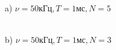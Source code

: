 \documentclass[a4paper,12pt]{article} %
\begin{document}
\begin{figure}[h!]
\begin{minipage}[h!]{0.47\linewidth}
 a) $\nu = 50 кГц, T = 1 мс, N = 5$\\
\end{minipage}
\hfill
\begin{minipage}[h!]{0.47\linewidth}
 \\b) $\nu = 50 кГц, T = 1 мс, N = 3$
\end{minipage}
\vfill
\begin{minipage}[h!]{0.47\linewidth}

\end{minipage}
\end{figure}
\end{document}
